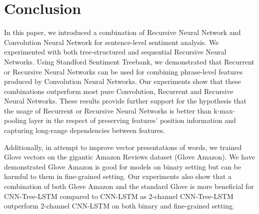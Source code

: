 \section{Conclusion}
In this paper, we introduced a combination of Recursive Neural Network and Convolution Neural Network for sentence-level sentiment analysis.
We experimented with both tree-structured and sequential Recursive Neural Networks.
Using Standford Sentiment Treebank, we demonstrated that Recurrent or Recursive Neural Networks can be used for combining phrase-level features produced by Convolution Neural Networks.
Our experiments show that these combinations outperform most pure Convolution, Recurrent and Recursive Neural Networks. 
These results provide further support for the hypothesis that the usage of Recurrent or Recursive Neural Networks is better than k-max-pooling layer in the respect of preserving features' position information and capturing long-range dependencies between features. 

Additionally, in attempt to improve vector presentations of words, we trained Glove vectors on the gigantic Amazon Reviews dataset (Glove Amazon).
We have demonstrated Glove Amazon is good for models on binary setting but can be harmful to them in fine-grained setting.
Our experiments also show that a combination of both Glove Amazon and the standard Glove is more beneficial for CNN-Tree-LSTM compared to CNN-LSTM as 2-channel CNN-Tree-LSTM outperform 2-channel CNN-LSTM on both binary and fine-grained setting.

